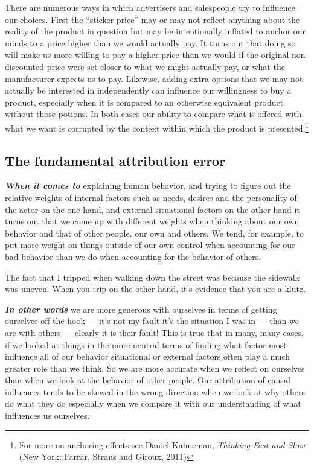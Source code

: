 \documentclass[12pt, openany]{book}
\begin{document}
There are numerous ways in which advertisers and salespeople try to influence our choices. First the ``sticker price'' may or may not reflect anything about the reality of the product in question but may be intentionally inflated to anchor our minds to a price higher than we would actually pay. It turns out that doing so will make us more willing to pay a higher price than we would if the original non-discounted price were set closer to what we might actually pay, or what the manufacturer expects us to pay. Likewise, adding extra options that we may not actually be interested in independently can influence our willingness to buy a product, especially when it is compared to an otherwise equivalent product without those potions. In both cases our ability to compare what is offered with what we want is corrupted by the context within which the product is presented.\footnote{For more on anchoring effects see Daniel Kahneman, \emph{Thinking Fast and Slow} (New York: Farrar, Straus and Giroux, 2011)}

\hypertarget{the-fundamental-attribution-error}{%
\subsection*{The fundamental attribution error}\label{the-fundamental-attribution-error}}


\textbf{\emph{When it comes to}} explaining human behavior, and trying to figure out the relative weights of internal factors such as needs, desires and the personality of the actor on the one hand, and external situational factors on the other hand it turns out that we come up with different weights when thinking about our own behavior and that of other people. our own and others. We tend, for example, to put more weight on things outside of our own control when accounting for our bad behavior than we do when accounting for the behavior of others.

\begin{center}

\begin{argument}

The fact that I tripped when walking down the street was because the sidewalk was uneven. When you trip on the other hand, it's evidence that you are a klutz.

\end{argument}

\end{center}

\textbf{\emph{In other words}} we are more generous with ourselves in terms of getting ourselves off the hook --- it's not my fault it's the situation I was in --- than we are with others --- clearly it is their fault! This is true that in many, many cases, if we looked at things in the more neutral terms of finding what factor most influence all of our behavior situational or external factors often play a much greater role than we think. So we are more accurate when we reflect on ourselves than when we look at the behavior of other people. Our attribution of causal influences tends to be skewed in the wrong direction when we look at why others do what they do especially when we compare it with our understanding of what influences us ourselves.
\end{document}
